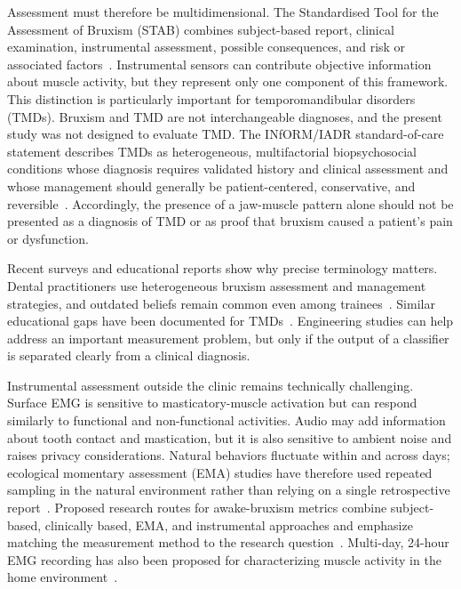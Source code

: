 \documentclass[pdflatex,sn-nature,iicol]{sn-jnl}
\begin{document}
Assessment must therefore be multidimensional. The Standardised Tool for the Assessment of Bruxism (STAB) combines subject-based report, clinical examination, instrumental assessment, possible consequences, and risk or associated factors~\cite{manfredini2024standardised}. Instrumental sensors can contribute objective information about muscle activity, but they represent only one component of this framework. This distinction is particularly important for temporomandibular disorders (TMDs). Bruxism and TMD are not interchangeable diagnoses, and the present study was not designed to evaluate TMD. The INfORM/IADR standard-of-care statement describes TMDs as heterogeneous, multifactorial biopsychosocial conditions whose diagnosis requires validated history and clinical assessment and whose management should generally be patient-centered, conservative, and reversible~\cite{inform2025tmd}. Accordingly, the presence of a jaw-muscle pattern alone should not be presented as a diagnosis of TMD or as proof that bruxism caused a patient's pain or dysfunction.

Recent surveys and educational reports show why precise terminology matters. Dental practitioners use heterogeneous bruxism assessment and management strategies, and outdated beliefs remain common even among trainees~\cite{mungia2025approaches,nasanen2026competence}. Similar educational gaps have been documented for TMDs~\cite{sangalli2026education}. Engineering studies can help address an important measurement problem, but only if the output of a classifier is separated clearly from a clinical diagnosis.

Instrumental assessment outside the clinic remains technically challenging. Surface EMG is sensitive to masticatory-muscle activation but can respond similarly to functional and non-functional activities. Audio may add information about tooth contact and mastication, but it is also sensitive to ambient noise and raises privacy considerations. Natural behaviors fluctuate within and across days; ecological momentary assessment (EMA) studies have therefore used repeated sampling in the natural environment rather than relying on a single retrospective report~\cite{bracci2018frequency,colonna2025fluctuation}. Proposed research routes for awake-bruxism metrics combine subject-based, clinically based, EMA, and instrumental approaches and emphasize matching the measurement method to the research question~\cite{bracci2024metrics}. Multi-day, 24-hour EMG recording has also been proposed for characterizing muscle activity in the home environment~\cite{colonna2023electromyographic}.
\end{document}
